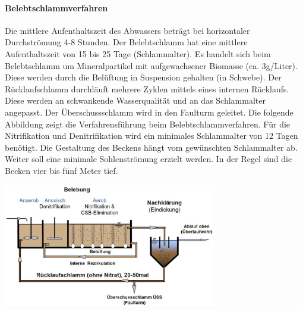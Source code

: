 \documentclass[9pt, openright=false]{scrartcl}
\begin{document}
\paragraph{Belebtschlammverfahren} Die mittlere Aufenthaltszeit des Abwassers beträgt bei horizontaler Durchströmung 4-8 Stunden. Der Belebtschlamm hat eine mittlere Aufenthaltszeit von 15 bis 25 Tage (Schlammalter). Es handelt sich beim Belebtschlamm um Mineralpartikel mit aufgewachsener Biomasse (ca. 3g/Liter). Diese werden durch die Belüftung in Suspension gehalten (in Schwebe). Der Rücklaufschlamm durchläuft mehrere Zyklen mittels eines internen Rücklaufs. Diese werden an schwankende Wasserqualität und an das Schlammalter angepasst. Der Überschussschlamm wird in den Faulturm geleitet. Die folgende Abbildung zeigt die Verfahrensführung beim Belebtschlammverfahren. Für die Nitrifikation und Denitrifikation wird ein minimales Schlammalter von 12 Tagen benötigt. Die Gestaltung des Beckens hängt vom gewünschten Schlammalter ab. Weiter soll eine minimale Sohlenströmung erzielt werden. In der Regel sind die Becken vier bis fünf Meter tief. 
\begin{center}
\includegraphics[width=0.7\textwidth]{images/belebt}
\end{center}
\end{document}

